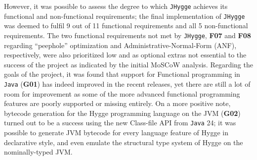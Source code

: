 However, it was possible to assess the degree to which \texttt{JHygge} achieves its functional and non-functional requirements;
the final implementation of \texttt{JHygge} was deemed to fulfil 9 out of 11 functional requirements and all 5 non-functional requirements.
The two functional requirements not met by \texttt{JHygge}, \textbf{F07} and \textbf{F08} regarding ``peephole'' optimization
and Administrative-Normal-Form (ANF), respectively, were also prioritized low and as optional extras not essential to the success of the project
as indicated by the initial MoSCoW\cite{moscow} analysis.
Regarding the goals of the project, it was found that support for Functional programming in \texttt{Java} (\textbf{G01}) has
indeed improved in the recent releases, yet there are still a lot of room for improvement as some of the more advanced functional programming
features are poorly supported or missing entirely. On a more positive note, bytecode generation for the Hygge programming language on the
JVM (\textbf{G02}) turned out to be a success using the new Class-file API from \texttt{Java} 24; it was possible to generate JVM bytecode
for every language feature of Hygge in declarative style, and even emulate the structural type system of Hygge on the nominally-typed JVM.
